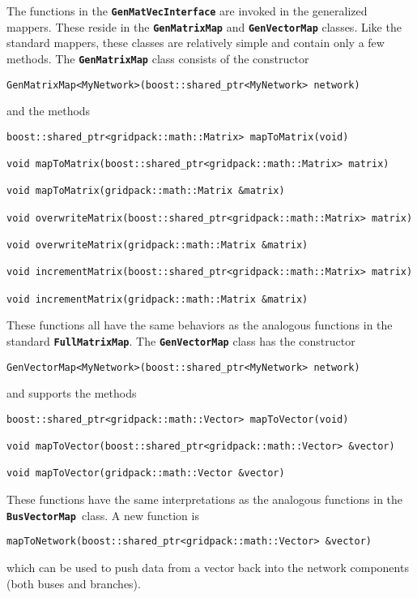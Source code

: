 The functions in the \texttt{\textbf{GenMatVecInterface}} are invoked in the generalized mappers. These reside in the \texttt{\textbf{GenMatrixMap}} and \texttt{\textbf{GenVectorMap}} classes. Like the standard mappers, these classes are relatively simple and contain only a few methods. The \texttt{\textbf{GenMatrixMap}} class consists of the constructor

{
\color{red}
\begin{Verbatim}[fontseries=b]
GenMatrixMap<MyNetwork>(boost::shared_ptr<MyNetwork> network)
\end{Verbatim}
}

and the methods

{
\color{red}
\begin{Verbatim}[fontseries=b]
boost::shared_ptr<gridpack::math::Matrix> mapToMatrix(void)

void mapToMatrix(boost::shared_ptr<gridpack::math::Matrix> matrix)

void mapToMatrix(gridpack::math::Matrix &matrix)

void overwriteMatrix(boost::shared_ptr<gridpack::math::Matrix> matrix)

void overwriteMatrix(gridpack::math::Matrix &matrix)

void incrementMatrix(boost::shared_ptr<gridpack::math::Matrix> matrix)

void incrementMatrix(gridpack::math::Matrix &matrix)
\end{Verbatim}
}

These functions all have the same behaviors as the analogous functions in the standard \texttt{\textbf{FullMatrixMap}}. The \texttt{\textbf{GenVectorMap}} class has the constructor

{
\color{red}
\begin{Verbatim}[fontseries=b]
GenVectorMap<MyNetwork>(boost::shared_ptr<MyNetwork> network)
\end{Verbatim}
}

and supports the methods

{
\color{red}
\begin{Verbatim}[fontseries=b]
boost::shared_ptr<gridpack::math::Vector> mapToVector(void)

void mapToVector(boost::shared_ptr<gridpack::math::Vector> &vector)

void mapToVector(gridpack::math::Vector &vector)
\end{Verbatim}
}

These functions have the same interpretations as the analogous functions in the \texttt{\textbf{BusVectorMap }}class. A new function is

{
\color{red}
\begin{Verbatim}[fontseries=b]
mapToNetwork(boost::shared_ptr<gridpack::math::Vector> &vector)
\end{Verbatim}
}

which can be used to push data from a vector back into the network components (both buses and branches).
